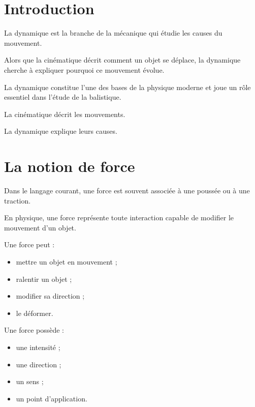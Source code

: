 
\section{Introduction}

La dynamique est la branche de la mécanique qui étudie les causes du mouvement.

Alors que la cinématique décrit comment un objet se déplace, la dynamique
cherche à expliquer pourquoi ce mouvement évolue.

La dynamique constitue l'une des bases de la physique moderne et joue un rôle
essentiel dans l'étude de la balistique.

\begin{aretenir}

La cinématique décrit les mouvements.

La dynamique explique leurs causes.

\end{aretenir}

\section{La notion de force}

Dans le langage courant, une force est souvent associée à une poussée ou à une
traction.

En physique, une force représente toute interaction capable de modifier le
mouvement d'un objet.

Une force peut :

\begin{itemize}
\item mettre un objet en mouvement ;
\item ralentir un objet ;
\item modifier sa direction ;
\item le déformer.
\end{itemize}

Une force possède :

\begin{itemize}
\item une intensité ;
\item une direction ;
\item un sens ;
\item un point d'application.
\end{itemize}

